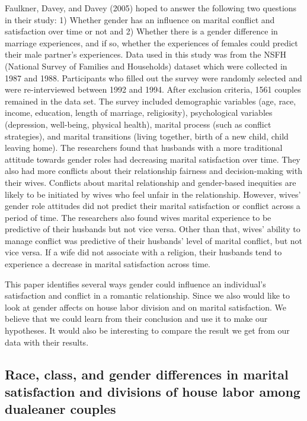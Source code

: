 \documentclass[
  english,
  man]{apa6}
\begin{document}
Faulkner, Davey, and Davey (2005) hoped to answer the following two questions in their study: 1) Whether gender has an influence on marital conflict and satisfaction over time or not and 2) Whether there is a gender difference in marriage experiences, and if so, whether the experiences of females could predict their male partner's experiences. Data used in this study was from the NSFH (National Survey of Families and Households) dataset which were collected in 1987 and 1988. Participants who filled out the survey were randomly selected and were re-interviewed between 1992 and 1994. After exclusion criteria, 1561 couples remained in the data set. The survey included demographic variables (age, race, income, education, length of marriage, religiosity), psychological variables (depression, well-being, physical health), marital process (such as conflict strategies), and marital transitions (living together, birth of a new child, child leaving home). The researchers found that husbands with a more traditional attitude towards gender roles had decreasing marital satisfaction over time. They also had more conflicts about their relationship fairness and decision-making with their wives. Conflicts about marital relationship and gender-based inequities are likely to be initiated by wives who feel unfair in the relationship. However, wives' gender role attitudes did not predict their marital satisfaction or conflict across a period of time. The researchers also found wives marital experience to be predictive of their husbands but not vice versa. Other than that, wives' ability to manage conflict was predictive of their husbands' level of marital conflict, but not vice versa. If a wife did not associate with a religion, their husbands tend to experience a decrease in marital satisfaction across time.

This paper identifies several ways gender could influence an individual's satisfaction and conflict in a romantic relationship. Since we also would like to look at gender affects on house labor division and on marital satisfaction. We believe that we could learn from their conclusion and use it to make our hypotheses. It would also be interesting to compare the result we get from our data with their results.

\hypertarget{race-class-and-gender-differences-in-marital-satisfaction-and-divisions-of-house-labor-among-dualeaner-couples}{%
\subsection{Race, class, and gender differences in marital satisfaction and divisions of house labor among dualeaner couples}\label{race-class-and-gender-differences-in-marital-satisfaction-and-divisions-of-house-labor-among-dualeaner-couples}}
\end{document}
